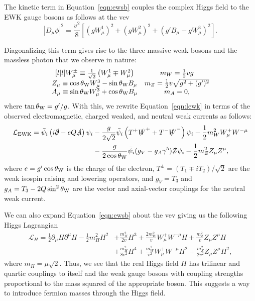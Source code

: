 The kinetic term in Equation~\ref{eqn:ewsb} couples the complex Higgs field to the EWK gauge bosons as follows at the vev
\begin{equation}
  \left| D_\mu \phi \right|^2 = \frac{v^2}{8} \left[ \left(g W_\mu^1 \right)^2 + \left(g W_\mu^2 \right)^2 + \left(g' B_\mu - g W_\mu^3 \right)^2 \right].
\end{equation}

Diagonalizing this term gives rise to the three massive weak bosons and the massless photon that we observe in nature:
\begin{equation}
  \begin{matrix}[l | l]
    W_\mu^{\pm} \equiv \frac{1}{\sqrt{2}} \left( W_\mu^1 \mp W_\mu^2 \right)
    & m_W = \frac{1}{2} vg \\
    Z_\mu \equiv \cos \theta_{\text{W}} W_\mu^3 - \sin \theta_{\text{W}} B_\mu
    & m_Z = \frac{1}{2} v \sqrt{g^2 + (g')^2} \\
    A_\mu \equiv \sin \theta_{\text{W}} W_\mu^3 + \cos \theta_{\text{W}} B_\mu
    & m_A = 0,
  \end{matrix}
\end{equation}
where $\tan \theta_{\text{W}} = g'/g$.
With this, we rewrite Equation~\ref{eqn:lewk} in terms of the observed electromagnetic, charged weaked, and neutral weak currents as follows:
\begin{align}
  \label{eqn:lewsb}
  \mathcal{L}_{\text{EWK}} %
  = \bar \psi_i \left( i \slashed \partial - e Q \slashed A \right) \psi_i
  & - \frac{g}{2\sqrt{2}} \bar \psi_i \left( T^+ \slashed W^+ + T^- \slashed W^- \right) \psi_i - \frac{1}{2} m_W^2 W_\mu^+ W^{-\mu} \nonumber \\
   & - \frac{g}{2 \cos \thetaw} \bar \psi_i (g_V - g_A \gamma^5) \slashed Z \psi_i - \frac{1}{2} m_Z^2 Z_\mu Z^\mu, 
\end{align}
where $e = g' \cos \theta_{\text{W}}$ is the charge of the electron, $T^\pm = (T_1 \mp i T_2)/\sqrt{2}$ are the weak isospin raising and lowering operators, and $g_V = T_3$ and $g_A = T_3 - 2 Q \sin^2 \theta_{\text{W}}$ are the vector and axial-vector couplings for the neutral weak current.

We can also expand Equation~\ref{eqn:ewsb} about the vev giving us the following Higgs Lagrangian
\begin{align}
  \mathcal{L}_H = \frac{1}{2} \partial_\mu H \partial^\mu H - \frac{1}{2} m_H^2 H^2
  & + \frac{m_H^2}{2 v} H^3 + \frac{2 m_W^2}{v} W_\mu^+ W^{-\mu} H + \frac{m_Z^2}{v} Z_\mu Z^\mu H \nonumber \\
  & + \frac{m_H^2}{8 v^2} H^4 + \frac{m_W^2}{v^2} W_\mu^+ W^{-\mu} H^2 + \frac{m_Z^2}{2v^2} Z_\mu Z^\mu H^2, 
\end{align}
where $m_H = \mu \sqrt{2} $.
Thus, we see that the real Higgs field $H$ has trilinear and quartic couplings to itself and the weak gauge bosons with coupling strengths proportional to the mass squared of the appropriate boson.
This suggests a way to introduce fermion masses through the Higgs field.

